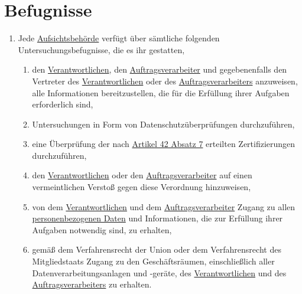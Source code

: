 \chapter{Befugnisse}
\label{ch:58}


\begin{enumerate}

  \item Jede \hyperref[itm:04-21]{Aufsichtsbehörde} verfügt über sämtliche folgenden Untersuchungsbefugnisse, die es ihr gestatten,
  \label{itm:58-1}

  \begin{enumerate}
  
    \item den \hyperref[itm:04-7]{Verantwortlichen}, den \hyperref[itm:04-8]{Auftragsverarbeiter} und gegebenenfalls den Vertreter des \hyperref[itm:04-7]{Verantwortlichen} oder des
     \hyperref[itm:04-8]{Auftragsverarbeiters} anzuweisen, alle Informationen bereitzustellen, die für die Erfüllung ihrer Aufgaben
     erforderlich sind,
    \label{itm:58-1a}

    \item Untersuchungen in Form von Datenschutzüberprüfungen durchzuführen,
    \label{itm:581b}

    \item eine Überprüfung der nach \hyperref[itm:42-7]{Artikel 42 Absatz 7} erteilten Zertifizierungen durchzuführen,
    \label{itm:58-1c}

    \item den \hyperref[itm:04-7]{Verantwortlichen} oder den \hyperref[itm:04-8]{Auftragsverarbeiter} auf einen vermeintlichen Verstoß gegen diese Verordnung
     hinzuweisen,
    \label{itm:58-1d}

    \item von dem \hyperref[itm:04-7]{Verantwortlichen} und dem \hyperref[itm:04-8]{Auftragsverarbeiter} Zugang zu allen \hyperref[itm:04-1]{personenbezogenen Daten} und
     Informationen, die zur Erfüllung ihrer Aufgaben notwendig sind, zu erhalten,
    \label{itm:58-1e}

    \item gemäß dem Verfahrensrecht der Union oder dem Verfahrensrecht des Mitgliedstaats Zugang zu den Geschäftsräumen,
     einschließlich aller Datenverarbeitungsanlagen und -geräte, des \hyperref[itm:04-7]{Verantwortlichen} und des \hyperref[itm:04-8]{Auftragsverarbeiters} zu
     erhalten.
    \label{itm:58-1f}


\end{enumerate}
\end{enumerate}
